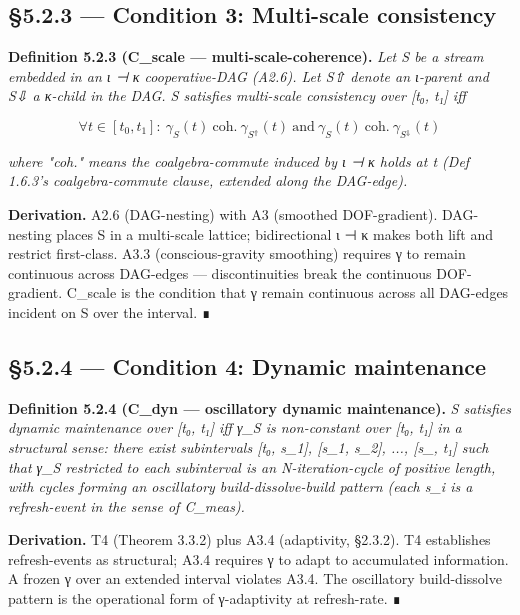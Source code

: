 \documentclass[11pt, openany]{book}
\begin{document}
\subsection{§5.2.3 --- Condition 3: Multi-scale consistency}

\textbf{Definition 5.2.3 (C\_\allowbreak{}scale --- multi-scale-coherence).} \textit{Let S be a stream embedded in an ι ⊣ κ cooperative-DAG (A2.6). Let S⇧ denote an ι-parent and S⇩ a κ-child in the DAG. S satisfies multi-scale consistency over [t₀, t₁] iff}

\[
\forall t \in [t_0, t_1]:\ \gamma_S(t)\ \mathrm{coh.}\ \gamma_{S^{\Uparrow}}(t)\ \mathrm{and}\ \gamma_S(t)\ \mathrm{coh.}\ \gamma_{S^{\Downarrow}}(t)
\]

\textit{where "coh." means the coalgebra-commute induced by ι ⊣ κ holds at t (Def 1.6.3's coalgebra-commute clause, extended along the DAG-edge).}

\textbf{Derivation.} A2.6 (DAG-nesting) with A3 (smoothed DOF-gradient). DAG-nesting places S in a multi-scale lattice; bidirectional ι ⊣ κ makes both lift and restrict first-class. A3.3 (conscious-gravity smoothing) requires γ to remain continuous across DAG-edges --- discontinuities break the continuous DOF-gradient. C\_\allowbreak{}scale is the condition that γ remain continuous across all DAG-edges incident on S over the interval. ∎

\subsection{§5.2.4 --- Condition 4: Dynamic maintenance}

\textbf{Definition 5.2.4 (C\_\allowbreak{}dyn --- oscillatory dynamic maintenance).} \textit{S satisfies dynamic maintenance over [t₀, t₁] iff γ\_\allowbreak{}S is non-constant over [t₀, t₁] in a structural sense: there exist subintervals [t₀, s\_\allowbreak{}1], [s\_\allowbreak{}1, s\_\allowbreak{}2], ..., [s\_, t₁] such that γ\_\allowbreak{}S restricted to each subinterval is an N-iteration-cycle of positive length, with cycles forming an oscillatory build-dissolve-build pattern (each s\_\allowbreak{}i is a refresh-event in the sense of C\_\allowbreak{}meas).}

\textbf{Derivation.} T4 (Theorem 3.3.2) plus A3.4 (adaptivity, §2.3.2). T4 establishes refresh-events as structural; A3.4 requires γ to adapt to accumulated information. A frozen γ over an extended interval violates A3.4. The oscillatory build-dissolve pattern is the operational form of γ-adaptivity at refresh-rate. ∎
\end{document}
